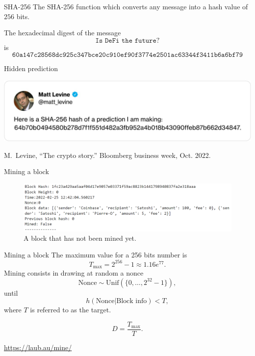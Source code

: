 \documentclass{beamer}
\begin{document}
\begin{frame}{SHA-256}
The SHA-256 function which converts any message into a hash value of $256$ bits.
\begin{tcolorbox}[enhanced,drop shadow, title=Example]
The hexadecimal digest of the message
$$
\texttt{Is DeFi the future?}
$$
is 
\footnotesize
$$
\texttt{60a147c28568dc925c347bce20c910ef90f3774e2501ac63344f3411b6a6bf79}
$$
\end{tcolorbox}
\end{frame}
\begin{frame}{Hidden prediction}
\begin{center}
 \includegraphics[width= \textwidth]{../../Figures/levine_twitter}
\end{center}
\footnotesize{
\begin{thebibliography}{1}
M.~Levine, ``The crypto story.'' Bloomberg business week, Oct. 2022.\\
\end{thebibliography}  
}




\end{frame}
\begin{frame}{Mining a block}
\begin{figure}[!ht]
    \includegraphics[width = \textwidth]{../../Figures/block_not_mined.png}
    \captionsetup{width=0.8\textwidth}
    \centering
    \caption{A block that has not been mined yet.}
    \label{fig:block_not_mined}
\end{figure}
\end{frame}
\begin{frame}{Mining a block}
The maximum value for a 256 bits number is
$$
T_\text{max} = 2^{256}-1 \approx 1.16e^{77}.
$$
Mining consists in drawing at random a nonce 
$$
\text{Nonce} \sim \text{Unif}(\{0,\ldots, 2^{32}-1\}),
$$
until 
$$
h(\text{Nonce}|\text{Block info})<T,
$$
where $T$ is referred to as the target.
\begin{tcolorbox}[enhanced,drop shadow, title=Difficulty of the cryptopuzzle]
$$
D = \frac{T_{\max}}{T}.
$$
\end{tcolorbox}
\url{https://laub.au/mine/}
\end{frame}
\end{document}
